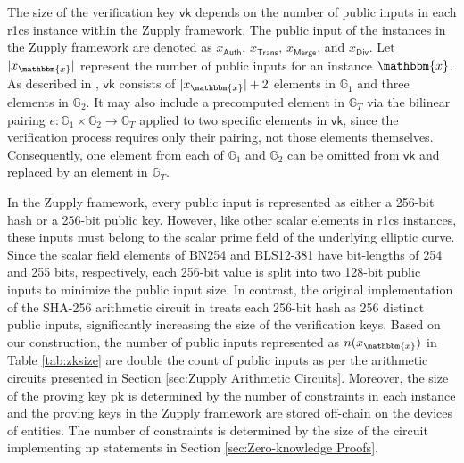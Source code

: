 The size of the verification key \(\textsf{vk}\) depends on the number of public inputs in each \gls{r1cs} instance within the Zupply framework. The public input of the instances in the Zupply framework are denoted as \(x_\mathsf{Auth}\), \(x_\mathsf{Trans}\), \(x_\mathsf{Merge}\), and \(x_\mathsf{Div}\).
Let \(|x_\mathbbm{x}|\) represent the number of public inputs for an instance \(\mathbbm{x}\). As described in \cite{Groth2016}, \(\textsf{vk}\) consists of \(|x_\mathbbm{x}| + 2\) elements in \(\mathbb{G}_1\) and three elements in \(\mathbb{G}_2\). It may also include a precomputed element in \(\mathbb{G}_T\) via the bilinear pairing \( e: \mathbb{G}_1 \times \mathbb{G}_2 \to \mathbb{G}_T \) applied to two specific elements in \(\textsf{vk}\), since the verification process requires only their pairing, not those elements themselves. Consequently, one element from each of \(\mathbb{G}_1\) and \(\mathbb{G}_2\) can be omitted from \(\textsf{vk}\) and replaced by an element in \(\mathbb{G}_T\).

In the Zupply framework, every public input is represented as either a 256-bit hash or a 256-bit public key. However, like other scalar elements in \gls{r1cs} instances, these inputs must belong to the scalar prime field of the underlying elliptic curve. Since the scalar field elements of BN254 and BLS12-381 have bit-lengths of 254 and 255 bits, respectively, each 256-bit value is split into two 128-bit public inputs to minimize the public input size. In contrast, the original implementation of the SHA-256 arithmetic circuit in \cite{libsnark} treats each 256-bit hash as 256 distinct public inputs, significantly increasing the size of the verification keys. Based on our construction, the number of public inputs represented as $n(x_\mathbbm{x})$ in Table \ref{tab:zksize} are double the count of public inputs as per the arithmetic circuits presented in Section \ref{sec:Zupply Arithmetic Circuits}. Moreover, the size of the proving key \textsf{pk} is determined by the number of constraints in each instance and the proving keys in the Zupply framework are stored off-chain on the devices of entities. The number of constraints is determined by the size of the circuit implementing \gls{np} statements in Section \ref{sec:Zero-knowledge Proofs}. 

